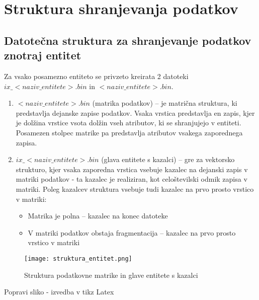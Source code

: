 \documentclass[a4paper,12pt,openright]{book}
\begin{document}
    \section{Struktura shranjevanja podatkov}
        \subsection{Datotečna struktura za shranjevanje podatkov znotraj entitet}
        Za vsako posamezno entiteto se privzeto kreirata 2 datoteki $ix\_<naziv\_entitete>.bin$ in $<naziv\_entitete>.bin$.
        \begin{enumerate}
            \item $<naziv\_entitete>.bin$ (matrika podatkov) – je matrična struktura, ki predstavlja dejanske zapise podatkov. Vsaka vrstica predstavlja en zapis, kjer je dolžina vrstice vsota dolžin vseh atributov, ki se shranjujejo v entiteti. Posamezen stolpec matrike pa predstavlja atributov vsakega zaporednega zapisa.
            \item $ix\_<naziv\_entitete>.bin$ (glava entitete s kazalci) – gre za vektorsko strukturo, kjer vsaka zaporedna vrstica vsebuje kazalec na dejanski zapis v matriki podatkov - ta kazalec je realiziran, kot celoštevilski odmik zapisa v matriki. Poleg kazalcev struktura vsebuje tudi kazalec na prvo prosto vrstico v matriki:
            \begin{itemize}
                \item Matrika je polna – kazalec na konec datoteke
                \item V matriki podatkov obstaja fragmentacija – kazalec na prvo prosto vrstico v matriki 
            \end{itemize}
        \end{enumerate}

        \begin{figure}[h]
            \centerline{\texttt{[image: struktura\_entitet.png]}}
            \caption{Struktura podatkovne matrike in glave entitete s kazalci}
            \label{sl:mindmap}
        \end{figure}

        \colorbox{BurntOrange}{Popravi sliko - izvedba v tikz Latex}
        
        
\end{document}
